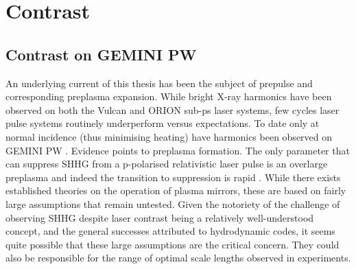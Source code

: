 \section{Contrast}\label{sec:ch4-contrast}
\subsection{Contrast on GEMINI PW}

An underlying current of this thesis has been the subject of prepulse and corresponding preplasma expansion. While bright X-ray harmonics have been observed on both the Vulcan \cite{dromeyBrightMultikeVHarmonic2007} and ORION sub-ps laser systems, few cycles laser pulse systems routinely underperform versus expectations. To date only at normal incidence (thus minimising heating) have harmonics been observed on GEMINI PW \cite{dromeyCoherentSynchrotronEmission2013}. Evidence points to preplasma formation. The only parameter that can suppress SHHG from a p-polarised relativistic laser pulse is an overlarge preplasma \cite{dollarScalingHighorderHarmonic2013} and indeed the transition to suppression is rapid \cite{kahalyDirectObservationDensityGradient2013}. While there exists established theories on the operation of plasma mirrors, these are based on fairly large assumptions that remain untested. Given the notoriety of the challenge of observing SHHG despite laser contrast being a relatively well-understood concept, and the general successes attributed to hydrodynamic codes, it seems quite possible that these large assumptions are the critical concern. They could also be responsible for the range of optimal scale lengths observed in experiments. 

